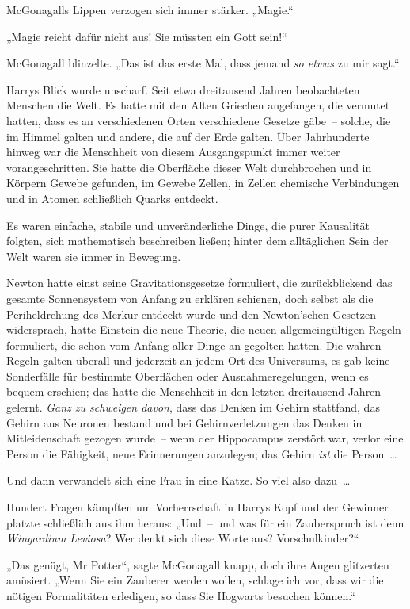 {McGonagalls Lippen verzogen sich immer stärker. „Magie.“

„Magie reicht dafür nicht aus! Sie müssten ein Gott sein!“

McGonagall blinzelte. „Das ist das erste Mal, dass jemand \emph{so etwas} zu mir sagt.“

Harrys Blick wurde unscharf. Seit etwa dreitausend Jahren beobachteten Menschen die Welt. Es hatte mit den Alten Griechen angefangen, die vermutet hatten, dass es an verschiedenen Orten verschiedene Gesetze gäbe~-- solche, die im Himmel galten und andere, die auf der Erde galten. Über Jahrhunderte hinweg war die Menschheit von diesem Ausgangspunkt immer weiter vorangeschritten. Sie hatte die Oberfläche dieser Welt durchbrochen und in Körpern Gewebe gefunden, im Gewebe Zellen, in Zellen chemische Verbindungen und in Atomen schließlich Quarks entdeckt.

Es waren einfache, stabile und unveränderliche Dinge, die purer Kausalität folgten, sich mathematisch beschreiben ließen; hinter dem alltäglichen Sein der Welt waren sie immer in Bewegung.

Newton hatte einst seine Gravitationsgesetze formuliert, die zurückblickend das gesamte Sonnensystem von Anfang zu erklären schienen, doch selbst als die Periheldrehung des Merkur entdeckt wurde und den Newton'schen Gesetzen widersprach, hatte Einstein die neue Theorie, die neuen allgemeingültigen Regeln formuliert, die schon vom Anfang aller Dinge an gegolten hatten. Die wahren Regeln galten überall und jederzeit an jedem Ort des Universums, es gab keine Sonderfälle für bestimmte Oberflächen oder Ausnahmeregelungen, wenn es bequem erschien; das hatte die Menschheit in den letzten dreitausend Jahren gelernt. \emph{Ganz zu schweigen davon}, dass das Denken im Gehirn stattfand, das Gehirn aus Neuronen bestand und bei Gehirnverletzungen das Denken in Mitleidenschaft gezogen wurde~-- wenn der Hippocampus zerstört war, verlor eine Person die Fähigkeit, neue Erinnerungen anzulegen; das Gehirn \emph{ist} die Person~…

Und dann verwandelt sich eine Frau in eine Katze. So viel also dazu~…

Hundert Fragen kämpften um Vorherrschaft in Harrys Kopf und der Gewinner platzte schließlich aus ihm heraus: „Und~-- und was für ein Zauberspruch ist denn \emph{Wingardium Leviosa}? Wer denkt sich diese Worte aus? Vorschulkinder?“

„Das genügt, Mr Potter“, sagte McGonagall knapp, doch ihre Augen glitzerten amüsiert. „Wenn Sie ein Zauberer werden wollen, schlage ich vor, dass wir die nötigen Formalitäten erledigen, so dass Sie Hogwarts besuchen können.“

}

